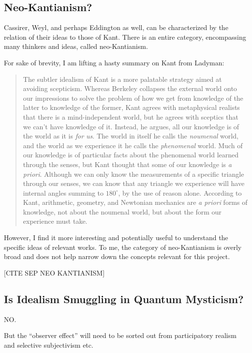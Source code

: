\subsection{Neo-Kantianism?}

Cassirer, Weyl, and perhaps Eddington as well, can be characterized by the relation of their ideas to those of Kant.  There is an entire category, encompassing many thinkers and ideas, called neo-Kantianism.  

For sake of brevity, I am lifting a hasty summary on Kant from Ladyman:


\begin{quote}
    The subtler idealism of Kant is a more palatable strategy aimed at avoiding scepticism.  Whereas Berkeley collapses the external world onto our impressions to solve the problem of how we get from knowledge of the latter to knowledge of the former, Kant agrees with metaphysical realists that there is a mind-independent world, but he agrees with sceptics that we can't have knowledge of it.  Instead, he argues, all our knowledge is of the world as it is \emph{for us}.  The world in itself he calls the \emph{noumenal} world, and the world as we experience it he calls the \emph{phenomenal} world.  Much of our knowledge is of particular facts about the phenomenal world learned through the senses, but Kant thought that some of our knowledge is \emph{a priori}.  Although we can only know the measurements of a specific triangle through our senses, we can know that any triangle we experience will have internal angles summing to $180^\circ$, by the use of reason alone.  According to Kant, arithmetic, geometry, and Newtonian mechanics are \emph{a priori} forms of knowledge, not about the noumenal world, but about the form our experience must take.  \citep[p. 146]{Ladyman2002}
\end{quote}

However, I find it more interesting and potentially useful to understand the specific ideas of relevant works.  To me, the category of neo-Kantianism is overly broad and does not help narrow down the concepts relevant for this project.

[CITE SEP NEO KANTIANISM]

\subsection{Is Idealism Smuggling in Quantum Mysticism?}

NO.

But the ``observer effect'' will need to be sorted out from participatory realism and selective subjectivism etc.

